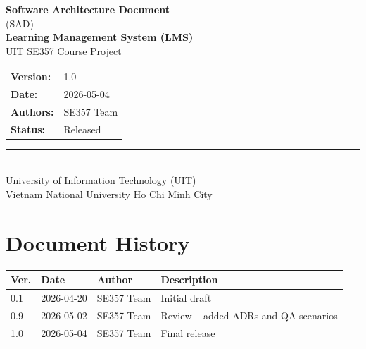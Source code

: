 \documentclass[12pt,a4paper]{article}
\begin{document}
\begin{titlepage}
  \centering
  \vspace*{2cm}

  {\Huge\bfseries\color{ecblue} Software Architecture Document}\\[0.5cm]
  {\large\color{ecgray} (SAD)}\\[2cm]

  {\LARGE\bfseries Learning Management System (LMS)}\\[0.5cm]
  {\large UIT SE357 Course Project}\\[2cm]

  \begin{tabular}{ll}
    \textbf{Version:}  & 1.0 \\[4pt]
    \textbf{Date:}     & 2026-05-04 \\[4pt]
    \textbf{Authors:}  & SE357 Team \\[4pt]
    \textbf{Status:}   & Released \\
  \end{tabular}

  \vfill

  \rule{\linewidth}{0.4pt}\\[0.3cm]
  {\small\color{ecgray}
    University of Information Technology (UIT) \\
    Vietnam National University Ho Chi Minh City
  }
\end{titlepage}

\section*{Document History}
\begin{tabularx}{\textwidth}{C{1.5cm} C{2.5cm} L{3cm} L{7cm}}
  \toprule
  \textbf{Ver.} & \textbf{Date} & \textbf{Author} & \textbf{Description} \\
   & 2026-04-20 & SE357 Team & Initial draft \\
  0.9 & 2026-05-02 & SE357 Team & Review -- added ADRs and QA scenarios \\
  1.0 & 2026-05-04 & SE357 Team & Final release \\
  \bottomrule
\end{tabularx}

\clearpage
\tableofcontents
\clearpage

\end{document}
